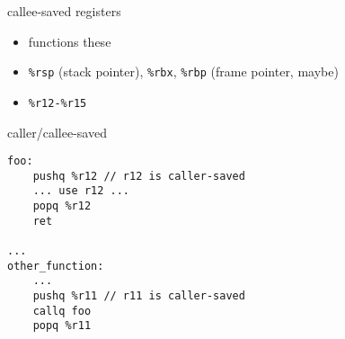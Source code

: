 \begin{frame}[fragile,label=calleeSaved]{callee-saved registers}
    \begin{itemize}
    \item functions  these
    \vspace{.5cm}
    \item {\tt \%rsp} (stack pointer), {\tt \%rbx}, {\tt \%rbp} (frame pointer, maybe)
    \item {\tt \%r12-\%r15}
    \end{itemize}
\end{frame}

\begin{frame}[fragile,label=callerCallee]{caller/callee-saved}
\lstset{style=small}
\begin{lstlisting}
foo:
    pushq %r12 // r12 is caller-saved
    ... use r12 ...
    popq %r12
    ret

...
other_function:
    ...
    pushq %r11 // r11 is caller-saved
    callq foo
    popq %r11
\end{lstlisting}
\end{frame}

